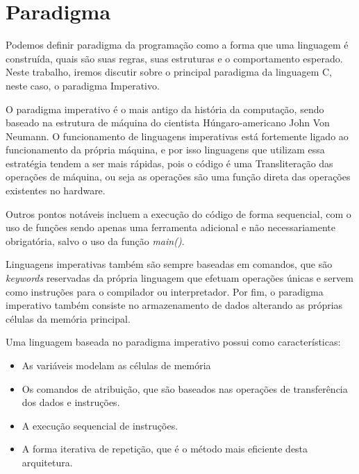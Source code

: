 \chapter{Paradigma}


Podemos definir paradigma da programação como a forma que uma linguagem é construída,
 quais são suas regras, suas estruturas e o comportamento esperado. Neste trabalho,
  iremos discutir sobre o principal paradigma da linguagem C, neste caso, o paradigma Imperativo.

O paradigma imperativo é o mais antigo da história da computação, sendo baseado na estrutura de máquina 
do cientista Húngaro-americano John Von Neumann. O funcionamento de linguagens imperativas está fortemente
 ligado ao funcionamento da própria máquina, e por isso linguagens que utilizam essa estratégia tendem a ser mais rápidas, 
 pois o código é uma Transliteração das operações de máquina, ou seja as operações são uma função direta das operações existentes no hardware.  

Outros pontos notáveis incluem a execução do código de forma sequencial, com o uso de funções sendo apenas uma ferramenta adicional
e não necessariamente obrigatória, salvo o uso da função \emph{main()}.

Linguagens imperativas também são sempre baseadas em comandos, que são \emph{keywords} 
reservadas da própria linguagem que efetuam operações únicas e servem como instruções para o compilador ou interpretador.
Por fim, o paradigma imperativo também consiste no armazenamento de dados alterando as próprias células da memória principal.


Uma linguagem baseada no paradigma imperativo possui como características:

\begin{itemize}
    \item As variáveis  modelam as células de memória
    \item Os comandos de atribuição, que são baseados nas operações de
    transferência dos dados e instruções.
    \item A execução sequencial de instruções.
    \item A forma iterativa de repetição, que é o método mais eficiente desta arquitetura.

\end{itemize}

\newpage